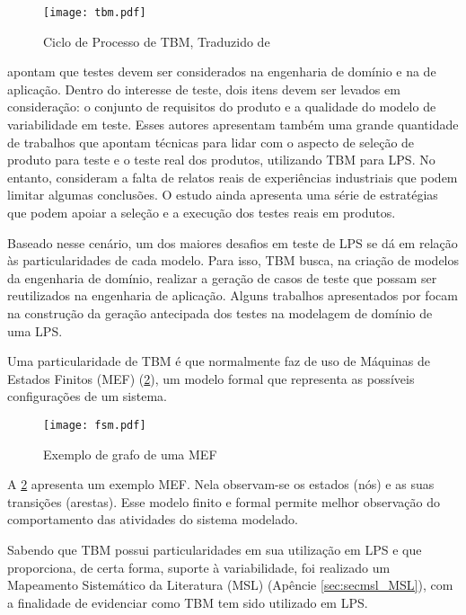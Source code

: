  \begin{figure}[h!]
 	\centering
 	\texttt{[image: tbm.pdf]}
 	\caption{ Ciclo de Processo de TBM, Traduzido de \citet{utting2010practical}}
 	\label{fig:tbm}
 \end{figure}

\citet{do2014strategies} apontam que testes devem ser considerados na engenharia de domínio e na de aplicação. Dentro do interesse de teste, dois itens devem ser levados em consideração: o conjunto de requisitos do produto e a qualidade do modelo de variabilidade em teste. Esses autores apresentam também uma grande quantidade de trabalhos que apontam técnicas para lidar com o aspecto de seleção de produto para teste e o teste real dos produtos, utilizando TBM para LPS. No entanto, consideram a falta de relatos reais de experiências industriais que podem limitar algumas conclusões. O estudo ainda apresenta uma série de estratégias que podem apoiar a seleção e a execução dos testes reais em produtos.

Baseado nesse cenário, um dos maiores desafios em teste de LPS se dá em relação às particularidades de cada modelo. Para isso, TBM busca, na criação de modelos da engenharia de domínio, realizar a geração de casos de teste que possam ser reutilizados na engenharia de aplicação. Alguns trabalhos apresentados por \citet{do2014strategies} focam na construção da geração antecipada dos testes na modelagem de domínio de uma LPS.

Uma particularidade de TBM é que normalmente faz de uso de Máquinas de Estados Finitos (MEF) (\ref{fig:tbmmef}), um modelo formal que representa as possíveis configurações de um sistema.

\begin{figure}[h!]
	\centering
	\texttt{[image: fsm.pdf]}
	\caption{ Exemplo de grafo de uma MEF \cite{costa2016split}}
	\label{fig:tbmmef}
\end{figure}

A \ref{fig:tbmmef} apresenta um exemplo MEF. Nela observam-se os estados (nós) e as suas transições (arestas). Esse modelo finito e formal permite melhor observação do comportamento das atividades do sistema modelado.

Sabendo que TBM possui particularidades em sua utilização em LPS e que proporciona, de certa forma, suporte à variabilidade, foi realizado um Mapeamento Sistemático da Literatura (MSL) (Apêncie \ref{sec:secmsl_MSL}), com a finalidade de evidenciar como TBM tem sido utilizado em LPS. 

